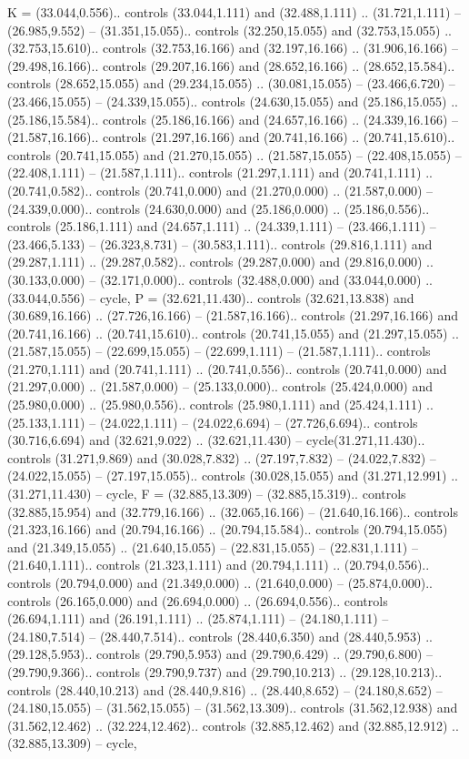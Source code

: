 {K} = {(33.044,0.556).. controls (33.044,1.111) and (32.488,1.111) .. (31.721,1.111) -- (26.985,9.552) -- (31.351,15.055).. controls (32.250,15.055) and (32.753,15.055) .. (32.753,15.610).. controls (32.753,16.166) and (32.197,16.166) .. (31.906,16.166) -- (29.498,16.166).. controls (29.207,16.166) and (28.652,16.166) .. (28.652,15.584).. controls (28.652,15.055) and (29.234,15.055) .. (30.081,15.055) -- (23.466,6.720) -- (23.466,15.055) -- (24.339,15.055).. controls (24.630,15.055) and (25.186,15.055) .. (25.186,15.584).. controls (25.186,16.166) and (24.657,16.166) .. (24.339,16.166) -- (21.587,16.166).. controls (21.297,16.166) and (20.741,16.166) .. (20.741,15.610).. controls (20.741,15.055) and (21.270,15.055) .. (21.587,15.055) -- (22.408,15.055) -- (22.408,1.111) -- (21.587,1.111).. controls (21.297,1.111) and (20.741,1.111) .. (20.741,0.582).. controls (20.741,0.000) and (21.270,0.000) .. (21.587,0.000) -- (24.339,0.000).. controls (24.630,0.000) and (25.186,0.000) .. (25.186,0.556).. controls (25.186,1.111) and (24.657,1.111) .. (24.339,1.111) -- (23.466,1.111) -- (23.466,5.133) -- (26.323,8.731) -- (30.583,1.111).. controls (29.816,1.111) and (29.287,1.111) .. (29.287,0.582).. controls (29.287,0.000) and (29.816,0.000) .. (30.133,0.000) -- (32.171,0.000).. controls (32.488,0.000) and (33.044,0.000) .. (33.044,0.556) -- cycle},
{P} = {(32.621,11.430).. controls (32.621,13.838) and (30.689,16.166) .. (27.726,16.166) -- (21.587,16.166).. controls (21.297,16.166) and (20.741,16.166) .. (20.741,15.610).. controls (20.741,15.055) and (21.297,15.055) .. (21.587,15.055) -- (22.699,15.055) -- (22.699,1.111) -- (21.587,1.111).. controls (21.270,1.111) and (20.741,1.111) .. (20.741,0.556).. controls (20.741,0.000) and (21.297,0.000) .. (21.587,0.000) -- (25.133,0.000).. controls (25.424,0.000) and (25.980,0.000) .. (25.980,0.556).. controls (25.980,1.111) and (25.424,1.111) .. (25.133,1.111) -- (24.022,1.111) -- (24.022,6.694) -- (27.726,6.694).. controls (30.716,6.694) and (32.621,9.022) .. (32.621,11.430) -- cycle(31.271,11.430).. controls (31.271,9.869) and (30.028,7.832) .. (27.197,7.832) -- (24.022,7.832) -- (24.022,15.055) -- (27.197,15.055).. controls (30.028,15.055) and (31.271,12.991) .. (31.271,11.430) -- cycle},
{F} = {(32.885,13.309) -- (32.885,15.319).. controls (32.885,15.954) and (32.779,16.166) .. (32.065,16.166) -- (21.640,16.166).. controls (21.323,16.166) and (20.794,16.166) .. (20.794,15.584).. controls (20.794,15.055) and (21.349,15.055) .. (21.640,15.055) -- (22.831,15.055) -- (22.831,1.111) -- (21.640,1.111).. controls (21.323,1.111) and (20.794,1.111) .. (20.794,0.556).. controls (20.794,0.000) and (21.349,0.000) .. (21.640,0.000) -- (25.874,0.000).. controls (26.165,0.000) and (26.694,0.000) .. (26.694,0.556).. controls (26.694,1.111) and (26.191,1.111) .. (25.874,1.111) -- (24.180,1.111) -- (24.180,7.514) -- (28.440,7.514).. controls (28.440,6.350) and (28.440,5.953) .. (29.128,5.953).. controls (29.790,5.953) and (29.790,6.429) .. (29.790,6.800) -- (29.790,9.366).. controls (29.790,9.737) and (29.790,10.213) .. (29.128,10.213).. controls (28.440,10.213) and (28.440,9.816) .. (28.440,8.652) -- (24.180,8.652) -- (24.180,15.055) -- (31.562,15.055) -- (31.562,13.309).. controls (31.562,12.938) and (31.562,12.462) .. (32.224,12.462).. controls (32.885,12.462) and (32.885,12.912) .. (32.885,13.309) -- cycle},
